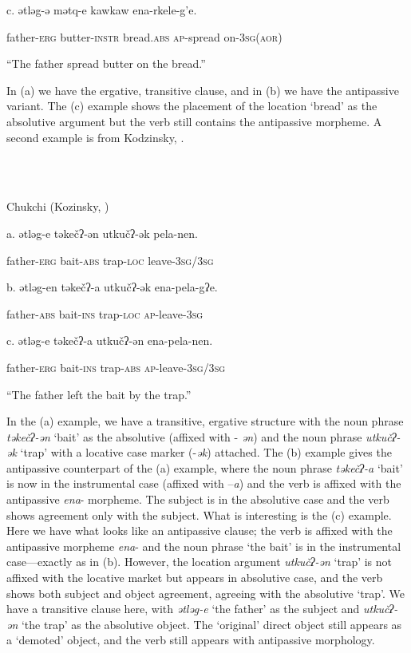 \documentclass[output=paper,modfonts,nonflat]{langsci/langscibook}
\begin{document}
c.  ətləg-ə  mətq-e  kawkaw  ena-rkele-g’e.

  father-\textsc{erg}  butter-\textsc{instr}  bread.\textsc{abs}  \textsc{ap}{}-spread on-3\textsc{sg}(\textsc{aor})

  “The father spread butter on the bread.”

In (a) we have the ergative, transitive clause, and in (b) we have the antipassive variant.  The (c) example shows the placement of the location ‘bread’ as the absolutive argument but the verb still contains the antipassive morpheme.  A second example is from Kodzinsky, \citet{NedjalkovPolinskaja1988}.

\ea%
    \label{ex:key:11}
    \gll\\
        \\
    \glt
    \z

          Chukchi (Kozinsky, \citealt{NedjalkovPolinskaja1988})

a.  ətləg-e   təkečʔ-ən   utkučʔ-ək   pela-nen.

  father-\textsc{erg}   bait-\textsc{abs}   trap-\textsc{loc}   leave-3\textsc{sg}/3\textsc{sg}

b.   ətləg-en   təkečʔ-a   utkučʔ-ək   ena-pela-gʔe.

  father-\textsc{abs}  bait-\textsc{ins}  trap-\textsc{loc}  \textsc{ap}{}-leave-3\textsc{sg}

c.  ətləg-e  təkečʔ-a  utkučʔ-ən  ena-pela-nen.

  father-\textsc{erg}  bait-\textsc{ins}  trap-\textsc{abs}  \textsc{ap}{}-leave-3\textsc{sg}/3\textsc{sg}

  “The father left the bait by the trap.”

In the (a) example, we have a transitive, ergative structure with the noun phrase \textit{təkečʔ-ən} ‘bait’ as the absolutive (affixed with - \textit{ən}) and the noun phrase \textit{utkučʔ-ək} ‘trap’ with a locative case marker (-\textit{ək}) attached.  The (b) example gives the antipassive counterpart of the (a) example, where the noun phrase \textit{təkečʔ-a} ‘bait’ is now in the instrumental case (affixed with –\textit{a}) and the verb is affixed with the antipassive \textit{ena}{}- morpheme.  The subject is in the absolutive case and the verb shows agreement only with the subject.  What is interesting is the (c) example.  Here we have what looks like an antipassive clause; the verb is affixed with the antipassive morpheme \textit{ena}{}- and the noun phrase ‘the bait’ is in the instrumental case—exactly as in (b).  However, the location argument \textit{utkučʔ-ən} ‘trap’ is not affixed with the locative market but appears in absolutive case, and the verb shows both subject and object agreement, agreeing with the absolutive ‘trap’. We have a transitive clause here, with \textit{ətləg-e} ‘the father’ as the subject and \textit{utkučʔ-ən} ‘the trap’ as the absolutive object.  The ‘original’ direct object still appears as a ‘demoted’ object, and the verb still appears with antipassive morphology. 
\end{document}
